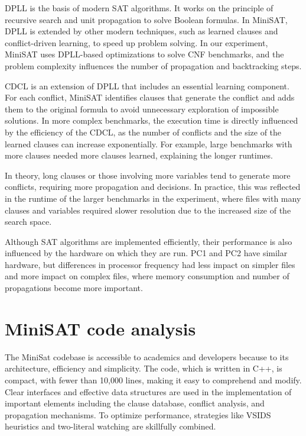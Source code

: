 \documentclass[runningheads]{llncs}
\begin{document}
DPLL is the basis of modern SAT algorithms. It works on the principle of recursive search and unit propagation to solve Boolean formulas.
In MiniSAT, DPLL is extended by other modern techniques, such as learned clauses and conflict-driven learning, to speed up problem solving.
In our experiment, MiniSAT uses DPLL-based optimizations to solve CNF benchmarks, and the problem complexity influences the number of propagation and backtracking steps. 

CDCL is an extension of DPLL that includes an essential learning component. For each conflict, MiniSAT identifies clauses that generate the conflict and adds them to the original formula to avoid unnecessary exploration of impossible solutions.
In more complex benchmarks, the execution time is directly influenced by the efficiency of the CDCL, as the number of conflicts and the size of the learned clauses can increase exponentially.
For example, large benchmarks with more clauses needed more clauses learned, explaining the longer runtimes.

In theory, long clauses or those involving more variables tend to generate more conflicts, requiring more propagation and decisions.
In practice, this was reflected in the runtime of the larger benchmarks in the experiment, where files with many clauses and variables required slower resolution due to the increased size of the search space.

Although SAT algorithms are implemented efficiently, their performance is also influenced by the hardware on which they are run.
PC1 and PC2 have similar hardware, but differences in processor frequency had less impact on simpler files and more impact on complex files, where memory consumption and number of propagations become more important.


\section{MiniSAT code analysis}
The MiniSat codebase is accessible to academics and developers because to its architecture, efficiency and simplicity. The code, which is written in C++, is compact, with fewer than 10,000 lines, making it easy to comprehend and modify. Clear interfaces and effective data structures are used in the implementation of important elements including the clause database, conflict analysis, and propagation mechanisms. To optimize performance, strategies like VSIDS heuristics and two-literal watching are skillfully combined. \\
\end{document}
